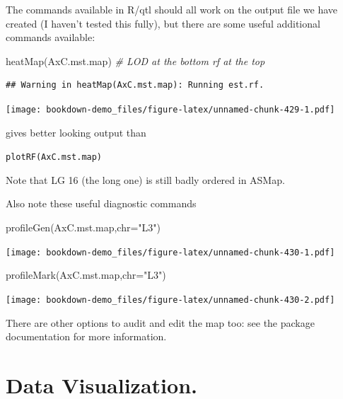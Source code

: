 \documentclass[
]{book}
\newenvironment{Shaded}{\begin{snugshade}}{\end{snugshade}}
\newcommand{\AttributeTok}[1]{\textcolor[rgb]{0.77,0.63,0.00}{#1}}
\newcommand{\CommentTok}[1]{\textcolor[rgb]{0.56,0.35,0.01}{\textit{#1}}}
\newcommand{\FunctionTok}[1]{\textcolor[rgb]{0.00,0.00,0.00}{#1}}
\newcommand{\NormalTok}[1]{#1}
\newcommand{\StringTok}[1]{\textcolor[rgb]{0.31,0.60,0.02}{#1}}
\begin{document}
The commands available in R/qtl should all work on the output file we have created (I haven't tested this fully), but there are some useful additional commands available:

\begin{Shaded}
\begin{Highlighting}[]
\FunctionTok{heatMap}\NormalTok{(AxC.mst.map) }\CommentTok{\# LOD at the bottom rf at the top }
\end{Highlighting}
\end{Shaded}

\begin{verbatim}
## Warning in heatMap(AxC.mst.map): Running est.rf.
\end{verbatim}

\texttt{[image: bookdown-demo\_files/figure-latex/unnamed-chunk-429-1.pdf]}

gives better looking output than

\texttt{plotRF(AxC.mst.map)}

Note that LG 16 (the long one) is still badly ordered in ASMap.

Also note these useful diagnostic commands

\begin{Shaded}
\begin{Highlighting}[]
\FunctionTok{profileGen}\NormalTok{(AxC.mst.map,}\AttributeTok{chr=}\StringTok{"L3"}\NormalTok{) }
\end{Highlighting}
\end{Shaded}

\texttt{[image: bookdown-demo\_files/figure-latex/unnamed-chunk-430-1.pdf]}

\begin{Shaded}
\begin{Highlighting}[]
\FunctionTok{profileMark}\NormalTok{(AxC.mst.map,}\AttributeTok{chr=}\StringTok{"L3"}\NormalTok{) }
\end{Highlighting}
\end{Shaded}

\texttt{[image: bookdown-demo\_files/figure-latex/unnamed-chunk-430-2.pdf]}

There are other options to audit and edit the map too: see the package documentation for more information.

\hypertarget{Data_Visualization}{%
\chapter{Data Visualization.}\label{Data_Visualization}}
\end{document}
